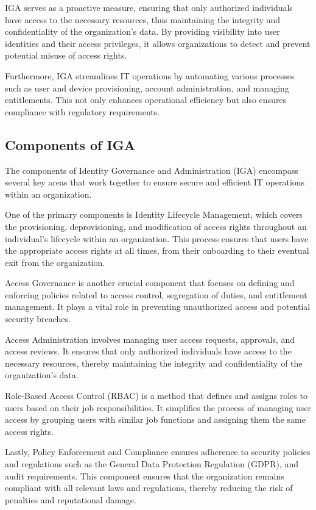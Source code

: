 IGA serves as a proactive measure, ensuring that only authorized individuals have access to the necessary resources, thus maintaining the integrity and confidentiality of the organization’s data. By providing visibility into user identities and their access privileges, it allows organizations to detect and prevent potential misuse of access rights.

Furthermore, IGA streamlines IT operations by automating various processes such as user and device provisioning, account administration, and managing entitlements. This not only enhances operational efficiency but also ensures compliance with regulatory requirements.

\subsection{Components of IGA}


The components of Identity Governance and Administration (IGA) encompass several key areas that work together to ensure secure and efficient IT operations within an organization.

One of the primary components is Identity Lifecycle Management, which covers the provisioning, deprovisioning, and modification of access rights throughout an individual's lifecycle within an organization. This process ensures that users have the appropriate access rights at all times, from their onboarding to their eventual exit from the organization.

Access Governance is another crucial component that focuses on defining and enforcing policies related to access control, segregation of duties, and entitlement management. It plays a vital role in preventing unauthorized access and potential security breaches.

Access Administration involves managing user access requests, approvals, and access reviews. It ensures that only authorized individuals have access to the necessary resources, thereby maintaining the integrity and confidentiality of the organization's data.

Role-Based Access Control (RBAC) is a method that defines and assigns roles to users based on their job responsibilities. It simplifies the process of managing user access by grouping users with similar job functions and assigning them the same access rights.

Lastly, Policy Enforcement and Compliance ensures adherence to security policies and regulations such as the General Data Protection Regulation (GDPR), and audit requirements. This component ensures that the organization remains compliant with all relevant laws and regulations, thereby reducing the risk of penalties and reputational damage.

